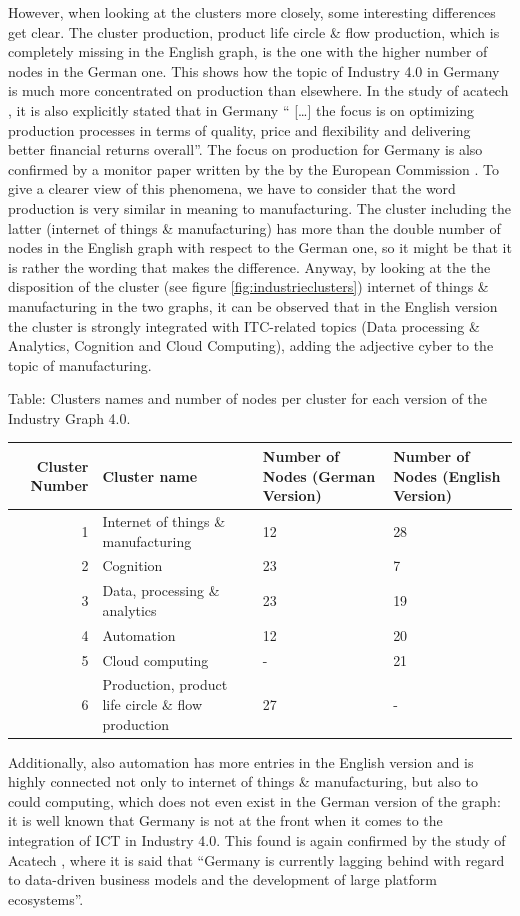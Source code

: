 \documentclass[]{book}
\begin{document}
However, when looking at the clusters more closely, some interesting
differences get clear. The cluster production, product life circle \&
flow production, which is completely missing in the English graph, is
the one with the higher number of nodes in the German one. This shows
how the topic of Industry 4.0 in Germany is much more concentrated on
production than elsewhere. In the study of acatech
\citep{kagermann2006industry}, it is also explicitly stated that in
Germany `` {[}\ldots{}{]} the focus is on optimizing production
processes in terms of quality, price and flexibility and delivering
better financial returns overall''. The focus on production for Germany
is also confirmed by a monitor paper written by the by the European
Commission \citep{industrie2016eu}. To give a clearer view of this
phenomena, we have to consider that the word production is very similar
in meaning to manufacturing. The cluster including the latter (internet
of things \& manufacturing) has more than the double number of nodes in
the English graph with respect to the German one, so it might be that it
is rather the wording that makes the difference. Anyway, by looking at
the the disposition of the cluster (see figure
\ref{fig:industrieclusters}) internet of things \& manufacturing in the
two graphs, it can be observed that in the English version the cluster
is strongly integrated with ITC-related topics (Data processing \&
Analytics, Cognition and Cloud Computing), adding the adjective cyber to
the topic of manufacturing.

Table: \label{tab:industrietab3} Clusters names and number of nodes per
cluster for each version of the Industry Graph 4.0.

\begin{tabular}{r|l|l|l}
\hline
Cluster Number & Cluster name & Number of Nodes (German Version) & Number of Nodes (English Version)\\
\hline
1 & Internet of things \& manufacturing & 12 & 28\\
\hline
2 & Cognition & 23 & 7\\
\hline
3 & Data, processing \& analytics & 23 & 19\\
\hline
4 & Automation & 12 & 20\\
\hline
5 & Cloud computing & - & 21\\
\hline
6 & Production, product life circle \& flow production & 27 & -\\
\hline
\end{tabular}

Additionally, also automation has more entries in the English version
and is highly connected not only to internet of things \& manufacturing,
but also to could computing, which does not even exist in the German
version of the graph: it is well known that Germany is not at the front
when it comes to the integration of ICT in Industry 4.0. This found is
again confirmed by the study of Acatech \citep{kagermann2006industry},
where it is said that ``Germany is currently lagging behind with regard
to data-driven business models and the development of large platform
ecosystems''.
\end{document}
